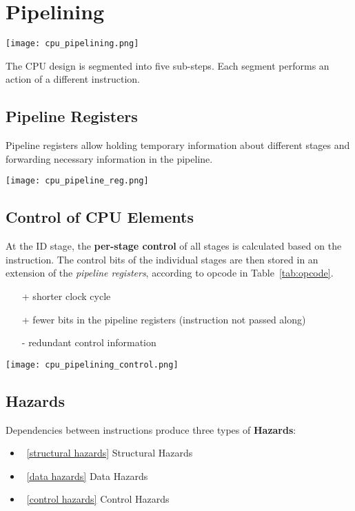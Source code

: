 \section{Pipelining}\label{pipelining}

\texttt{[image: cpu\_pipelining.png]}

The CPU design is segmented into five sub-steps. Each segment performs an action of a different instruction.

\subsection{Pipeline Registers}
Pipeline registers allow holding temporary information about different stages and forwarding necessary information in the pipeline.
\begin{center}
    \texttt{[image: cpu\_pipeline\_reg.png]}
\end{center}

\subsection{Control of CPU Elements}
At the ID stage, the \textbf{per-stage control} of all stages is calculated based on the instruction.
The control bits of the individual stages are then stored in an extension of the \textit{pipeline registers}, according to opcode in Table~\ref{tab:opcode}.
\begin{itemize}
    \item[+] shorter clock cycle
    \item[+] fewer bits in the pipeline registers (instruction not passed along)
    \item[-] redundant control information
\end{itemize}

\begin{center}
    \texttt{[image: cpu\_pipelining\_control.png]}
\end{center}

\subsection{Hazards}
Dependencies between instructions produce three types of \textbf{Hazards}:
\begin{itemize}
    \item~\ref{structural hazards} Structural Hazards
    \item~\ref{data hazards} Data Hazards
    \item~\ref{control hazards} Control Hazards
\end{itemize}

